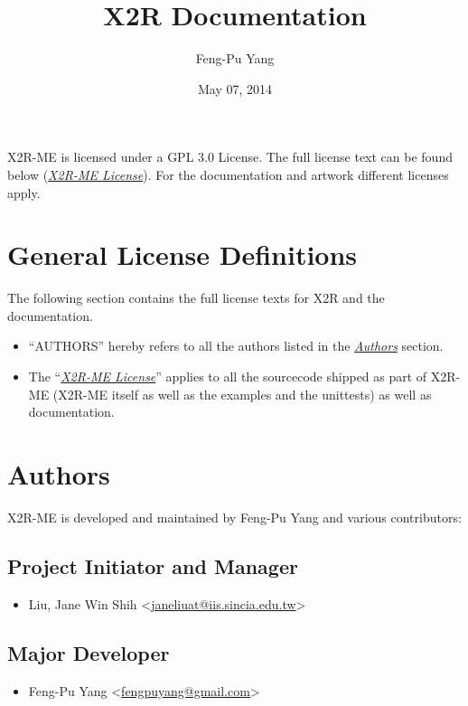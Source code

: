 \documentclass[letterpaper,10pt,english]{sphinxmanual}
\title{X2R Documentation}
\date{May 07, 2014}
\author{Feng-Pu Yang}
\begin{document}
\maketitle
\tableofcontents
{}\label{index::doc}


X2R-ME is licensed under a GPL 3.0 License. The full license text can be found below ({\hyperref[license:x2r-license]{\emph{X2R-ME License}}}).  For the documentation and artwork different licenses apply.


\chapter{General License Definitions}
\label{license:general-license-definitions}\label{license::doc}\label{license:license}
The following section contains the full license texts for X2R and the
documentation.
\begin{itemize}
\item {} 
``AUTHORS'' hereby refers to all the authors listed in the
{\hyperref[license:authors]{\emph{Authors}}} section.

\item {} 
The ``{\hyperref[license:x2r-license]{\emph{X2R-ME License}}}'' applies to all the sourcecode shipped as
part of X2R-ME (X2R-ME itself as well as the examples and the unittests)
as well as documentation.

\end{itemize}


\chapter{Authors}
\label{license:id1}\label{license:authors}
X2R-ME is developed and maintained by Feng-Pu Yang and
various contributors:


\section{Project Initiator and Manager}
\label{license:project-initiator-and-manager}\begin{itemize}
\item {} 
Liu, Jane Win Shih \textless{}\href{mailto:janeliuat@iis.sincia.edu.tw}{janeliuat@iis.sincia.edu.tw}\textgreater{}

\end{itemize}


\section{Major Developer}
\label{license:major-developer}\begin{itemize}
\item {} 
Feng-Pu Yang \textless{}\href{mailto:fengpuyang@gmail.com}{fengpuyang@gmail.com}\textgreater{}

\end{itemize}
\end{document}
